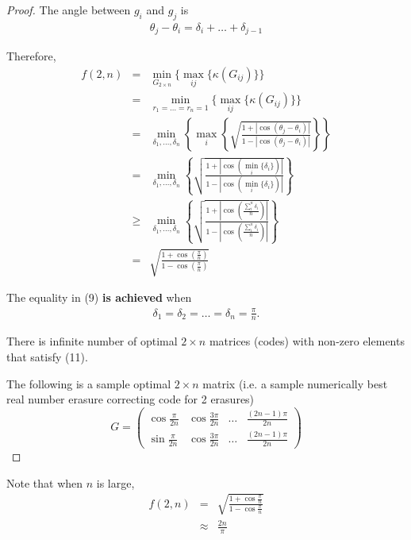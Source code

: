 \documentclass{sig-alternate}
\begin{document}
\begin{proof}
The angle between $g_i$ and $g_j$ is 
\begin{eqnarray}
\theta_j-\theta_i = \delta_i + \ldots + \delta_{j-1}
\end{eqnarray}

Therefore,
\begin{eqnarray}
f(2,n)  \nonumber
&=& \displaystyle \min_{G_{2 \times n} } 
\{ \displaystyle \max_{ij} \{ \kappa (G_{ij} )  \} \} \\ \nonumber
&=& \displaystyle \min_{ r_1=\ldots=r_n=1  }  
\{ \displaystyle \max_{ij} \{ \kappa (G_{ij} ) \} \}  \\ \nonumber
&=& \displaystyle \min_{\delta_1, \ldots, \delta_n} \left \{
\displaystyle \max_{i} \left \{ \sqrt { \frac{1+ |\cos (\theta_j-\theta_i) | }
{1- |\cos (\theta_j-\theta_i) | }  }  \right \} \right \} \\ \nonumber
&=& \displaystyle \min_{\delta_1, \ldots, \delta_n} \left \{
 \sqrt { \frac{1+ |\cos (\displaystyle\min_i \{\delta_i\})  | }
{1- |\cos (\displaystyle\min_i \{\delta_i\} ) | }  }   \right \} \\
&\geq& \displaystyle \min_{\delta_1, \ldots, \delta_n} \left \{
 \sqrt { \frac{1+ |\cos (\frac{\sum_i^n {\delta_i}}  {n} )  | }
{1- |\cos (\frac{\sum_i^n {\delta_i}}  {n} )   | }  }  \right \} \\
&=& \sqrt {\frac{1+ \cos ( \frac{\pi}  {n}  ) }
{1- \cos(  \frac{\pi}  {n}    ) }} 
\end{eqnarray}

The equality in (9) {\bf is achieved}  when 
\begin{eqnarray}
\delta_1=\delta_2=\ldots=\delta_n=\frac{\pi}{n}.
\end{eqnarray}


There is infinite number of optimal $2 \times n$ matrices (codes) with non-zero elements
that satisfy (11). 

The following is a sample optimal $2 \times n$ matrix 
(i.e. a sample numerically best real number erasure correcting code for 2 erasures)
\[ G= \left( \begin{array}{cccc}
\cos\frac{\pi}{2n}&\cos\frac{3\pi}{2n}&\ldots&\frac{(2n-1)\pi}{2n}  \\
\sin\frac{\pi}{2n}&\cos\frac{3\pi}{2n}&\ldots&\frac{(2n-1)\pi}{2n}      \end{array} \right)\]
\end{proof}



Note that when $n$ is large,  
\begin{eqnarray*}
f(2,n)
&=& \sqrt {\frac{1 + \cos \frac{\pi}  {n} }
{1- \cos \frac{\pi}  {n} } } \\
&\approx& \frac {2n}{\pi}  
\end{eqnarray*}
\end{document}
